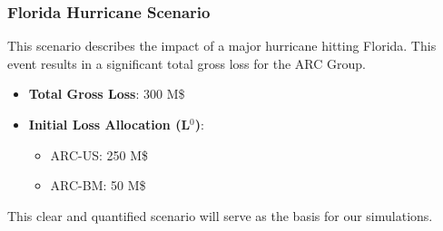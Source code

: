 \subsubsection{Florida Hurricane Scenario}

This scenario describes the impact of a major hurricane hitting Florida. This event results in a significant total gross loss for the ARC Group.

\begin{itemize}
    \item \textbf{Total Gross Loss}: 300 M\$
    \item \textbf{Initial Loss Allocation (L$^0$)}:
    \begin{itemize}
        \item ARC-US: 250 M\$
        \item ARC-BM: 50 M\$
    \end{itemize}
\end{itemize}

This clear and quantified scenario will serve as the basis for our simulations.
